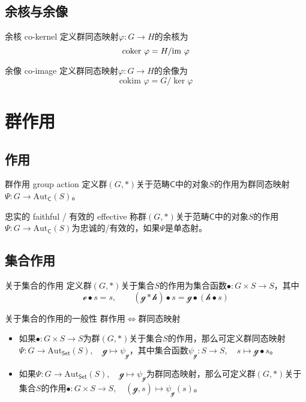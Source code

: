 \subsection{余核与余像}

\begin{definition}{余核 co-kernel}
	定义群同态映射$\varphi:G\to H$的余核为
	$$
	\text{coker }\varphi=H/\text{im } \varphi
	$$
\end{definition}

\begin{definition}{余像 co-image}
	定义群同态映射$\varphi:G\to H$的余像为
	$$
	\text{cokim }\varphi=G/\ker\varphi
	$$
\end{definition}

\section{群作用}

\subsection{作用}

\begin{definition}{群作用 group action}
	定义群$(G,*)$关于范畴$\mathsf{C}$中的对象$S$的作用为群同态映射$\Psi:G\to \mathrm{Aut}_{\mathsf{C}}(S)$。
\end{definition}

\begin{definition}{忠实的 faithful / 有效的 effective}
	称群$(G,*)$关于范畴$\mathsf{C}$中的对象$S$的作用$\Psi:G\to \mathrm{Aut}_{\mathsf{C}}(S)$为忠诚的/有效的，如果$\Psi$是单态射。
\end{definition}

\subsection{集合作用}

\begin{definition}{关于集合的作用}
	定义群$(G,*)$关于集合$S$的作用为集合函数$\bullet:G\times S\to S$，其中
	$$
	\mathcal{e}\bullet s=s,\qquad
	(\mathcal{g}*\mathcal{h})\bullet s=\mathcal{g}\bullet(\mathcal{h}\bullet s)
	$$
\end{definition}

\begin{definition}{关于集合的作用的一般性}
	群作用$\iff$群同态映射
	\begin{itemize}
		\item 如果$\bullet:G\times S\to S$为群$(G,*)$关于集合$S$的作用，那么可定义群同态映射$\Psi:G\to \mathrm{Aut}_{\mathsf{Set}}(S),\quad \mathcal{g}\mapsto \psi_{\mathcal{g}}$，其中集合函数$\psi_{\mathcal{g}}:S\to S,\quad s\mapsto \mathcal{g}\bullet s$。
		\item 如果$\Psi:G\to \mathrm{Aut}_{\mathsf{Set}}(S),\quad \mathcal{g}\mapsto \psi_{\mathcal{g}}$为群同态映射，那么可定义群$(G,*)$关于集合$S$的作用$\bullet:G\times S\to S,\quad (\mathcal{g},s)\mapsto \psi_{\mathcal{g}}(s)$。
	\end{itemize}
\end{definition}

